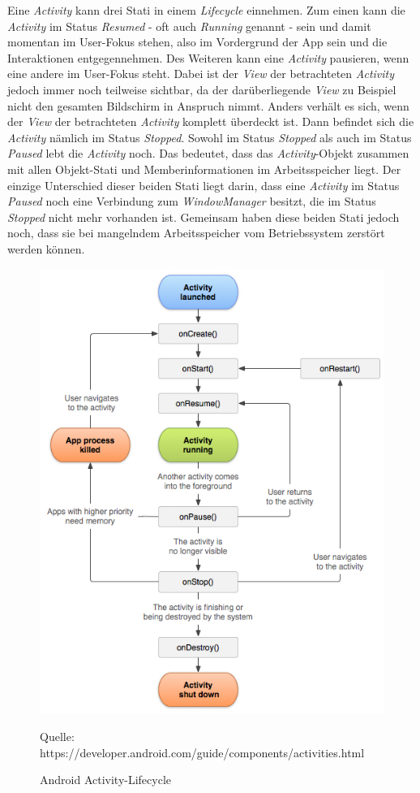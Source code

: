 Eine \textit{Activity} kann drei Stati in einem \textit{Lifecycle} einnehmen. Zum einen kann die \textit{Activity} im Status \textit{Resumed} - oft auch \textit{Running} genannt - sein und damit momentan im User-Fokus stehen, also im Vordergrund der App sein und die Interaktionen entgegennehmen. Des Weiteren kann eine \textit{Activity} pausieren, wenn eine andere im User-Fokus steht. Dabei ist der \textit{View} der betrachteten \textit{Activity} jedoch immer noch teilweise sichtbar, da der darüberliegende \textit{View} zu Beispiel nicht den gesamten Bildschirm in Anspruch nimmt. Anders verhält es sich, wenn der \textit{View} der betrachteten \textit{Activity} komplett überdeckt ist. Dann befindet sich die \textit{Activity} nämlich im Status \textit{Stopped}. Sowohl im Status \textit{Stopped} als auch im Status \textit{Paused} lebt die \textit{Activity} noch. Das bedeutet, dass das \textit{Activity}-Objekt zusammen mit allen Objekt-Stati und Memberinformationen im Arbeitsspeicher liegt. Der einzige Unterschied dieser beiden Stati liegt darin, dass eine \textit{Activity} im Status \textit{Paused} noch eine Verbindung zum \textit{WindowManager} besitzt, die im Status \textit{Stopped} nicht mehr vorhanden ist. Gemeinsam haben diese beiden Stati jedoch noch, dass sie bei mangelndem Arbeitsspeicher vom Betriebssystem zerstört werden können. 

\begin{figure}[h]
\centering
\includegraphics[width=0.8\linewidth]{Bilder/Android-ActivityLifecycle}
\caption{Android Activity-Lifecycle}
Quelle: https://developer.android.com/guide/components/activities.html
\label{pic:androidActivityLifecycle}
\end{figure}

